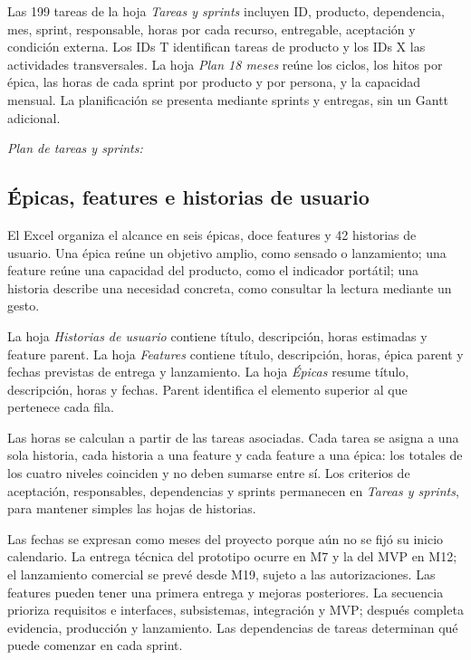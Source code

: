 Las 199 tareas de la hoja \textit{Tareas y sprints} incluyen ID, producto, dependencia, mes, sprint, responsable, horas por cada recurso, entregable, aceptación y condición externa. Los IDs T identifican tareas de producto y los IDs X las actividades transversales. La hoja \textit{Plan 18 meses} reúne los ciclos, los hitos por épica, las horas de cada sprint por producto y por persona, y la capacidad mensual. La planificación se presenta mediante sprints y entregas, sin un Gantt adicional.
\par\noindent\textit{Plan de tareas y sprints:} 

\subsection{Épicas, features e historias de usuario}
El Excel organiza el alcance en seis épicas, doce features y 42 historias de usuario. Una épica reúne un objetivo amplio, como sensado o lanzamiento; una feature reúne una capacidad del producto, como el indicador portátil; una historia describe una necesidad concreta, como consultar la lectura mediante un gesto.

La hoja \textit{Historias de usuario} contiene título, descripción, horas estimadas y feature parent. La hoja \textit{Features} contiene título, descripción, horas, épica parent y fechas previstas de entrega y lanzamiento. La hoja \textit{Épicas} resume título, descripción, horas y fechas. Parent identifica el elemento superior al que pertenece cada fila.

Las horas se calculan a partir de las tareas asociadas. Cada tarea se asigna a una sola historia, cada historia a una feature y cada feature a una épica: los totales de los cuatro niveles coinciden y no deben sumarse entre sí. Los criterios de aceptación, responsables, dependencias y sprints permanecen en \textit{Tareas y sprints}, para mantener simples las hojas de historias.

Las fechas se expresan como meses del proyecto porque aún no se fijó su inicio calendario. La entrega técnica del prototipo ocurre en M7 y la del MVP en M12; el lanzamiento comercial se prevé desde M19, sujeto a las autorizaciones. Las features pueden tener una primera entrega y mejoras posteriores. La secuencia prioriza requisitos e interfaces, subsistemas, integración y MVP; después completa evidencia, producción y lanzamiento. Las dependencias de tareas determinan qué puede comenzar en cada sprint.


